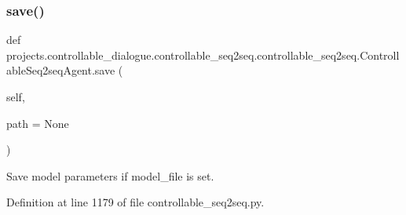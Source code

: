 \subsubsection{\texorpdfstring{save()}{save()}}
{\footnotesize\ttfamily def projects.\+controllable\+\_\+dialogue.\+controllable\+\_\+seq2seq.\+controllable\+\_\+seq2seq.\+Controllable\+Seq2seq\+Agent.\+save (\begin{DoxyParamCaption}\item[{}]{self,  }\item[{}]{path = {\ttfamily None} }\end{DoxyParamCaption})}

\begin{DoxyVerb}Save model parameters if model_file is set.
\end{DoxyVerb}
 

Definition at line 1179 of file controllable\+\_\+seq2seq.\+py.


